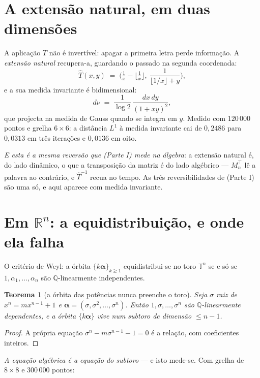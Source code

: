 \documentclass[11pt,a4paper]{article}
\theoremstyle{plain}
\newtheorem{teorema}{Teorema}[section]
\theoremstyle{definition}
\theoremstyle{remark}
\newcommand{\R}{\mathbb{R}}
\newcommand{\Q}{\mathbb{Q}}
\begin{document}
\section{A extensão natural, em duas dimensões}\label{sec:extnat}

A aplicação $T$ não é invertível: apagar a primeira letra perde informação. A \emph{extensão
natural} recupera-a, guardando o passado na segunda coordenada:
\[
  \widehat T(x,y) \;=\; \Big(\tfrac1x - \big\lfloor\tfrac1x\big\rfloor,\ \frac{1}{\lfloor 1/x\rfloor + y}\Big),
\]
e a sua medida invariante é bidimensional:
\[
  d\nu \;=\; \frac{1}{\log 2}\,\frac{dx\,dy}{(1+xy)^2} ,
\]
que projecta na medida de Gauss quando se integra em $y$. Medido com $120\,000$ pontos e grelha
$6\times6$: a distância $L^1$ à medida invariante cai de $0{,}2486$ para $0{,}0313$ em três
iterações e $0{,}0136$ em oito.

\emph{E esta é a mesma reversão que (Parte I) mede na álgebra}: a extensão natural é, do lado dinâmico, o
que a transposição da matriz é do lado algébrico --- $M_n^{\!\top}$ lê a palavra ao contrário, e
$\widehat T^{-1}$ recua no tempo. As três reversibilidades de (Parte I) são uma só, e aqui aparece com
medida invariante.

\section{Em $\R^n$: a equidistribuição, e onde ela falha}\label{sec:rn}

O critério de Weyl: a órbita $\{k\boldsymbol\alpha\}_{k\geq1}$ equidistribui-se no toro
$\mathbb T^n$ se e só se $1,\alpha_1,\dots,\alpha_n$ são $\Q$-linearmente independentes.

\begin{teorema}[a órbita das potências nunca preenche o toro]\label{thm:subtoro}
Seja $\sigma$ raiz de $x^n = m x^{n-1}+1$ e $\boldsymbol\alpha = (\sigma,\sigma^2,\dots,\sigma^n)$.
Então $1,\sigma,\dots,\sigma^n$ são $\Q$-linearmente \emph{dependentes}, e a órbita
$\{k\boldsymbol\alpha\}$ vive num subtoro de dimensão $\leq n-1$.
\end{teorema}

\begin{proof}
A própria equação $\sigma^n - m\sigma^{n-1} - 1 = 0$ é a relação, com coeficientes inteiros.
\end{proof}

\noindent \emph{A equação algébrica é a equação do subtoro} --- e isto mede-se. Com grelha de
$8\times8$ e $300\,000$ pontos:
\end{document}
